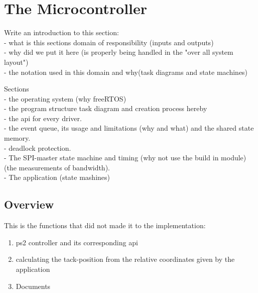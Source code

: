 
\section{The Microcontroller}
\label{sec:TheMicrocontroller}

Write an introduction to this section:\\
- what is this sections domain of responsibility (inputs and outputs)\\
- why did we put it here (is properly being handled in the "over all system layout")\\
- the notation used in this domain and why(task diagrams and state machines)


Sections\\
- the operating system (why freeRTOS)\\
- the program structure task diagram and creation process hereby\\

- the api for every driver. \\
- the event queue, its usage and limitations (why and what) and the shared state memory.\\
- deadlock protection. \\
- The SPI-master state machine and timing (why not use the build in module) (the measurements of bandwidth). \\
- The application (state mashines)

	















\subsection{Overview}

This is the functions that did not made it to the implementation:
\begin{enumerate}[noitemsep]
	
	\item ps2 controller and its corresponding api
	
	\item calculating the tack-position from the relative coordinates given by the application  
	
	\item Documents
	
\end{enumerate}






